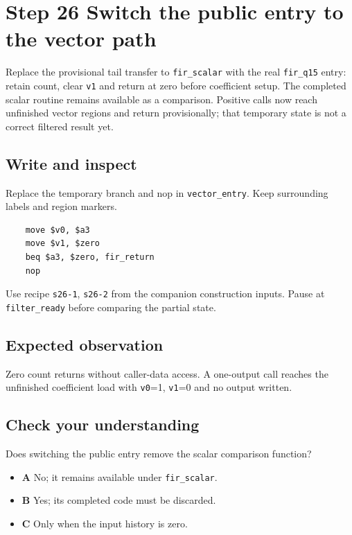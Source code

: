 \section{Step 26 Switch the public entry to the vector path}\label{fir-s26}

Replace the provisional tail transfer to \texttt{fir\_scalar} with the real \texttt{fir\_q15} entry: retain count, clear \texttt{v1} and return at zero before coefficient setup. The completed scalar routine remains available as a comparison. Positive calls now reach unfinished vector regions and return provisionally; that temporary state is not a correct filtered result yet.

\subsection{Write and inspect}
Replace the temporary branch and nop in \texttt{vector\_entry}. Keep surrounding labels and region markers.

\begin{verbatim}
    move $v0, $a3
    move $v1, $zero
    beq $a3, $zero, fir_return
    nop
\end{verbatim}
Use recipe \texttt{s26-1}, \texttt{s26-2} from the companion construction inputs. Pause at \texttt{filter\_ready} before comparing the partial state.

\subsection{Expected observation}
Zero count returns without caller-data access. A one-output call reaches the unfinished coefficient load with \texttt{v0}=1, \texttt{v1}=0 and no output written.

\subsection{Check your understanding}
Does switching the public entry remove the scalar comparison function?

\begin{itemize}
\item \textbf{A} No; it remains available under \texttt{fir\_scalar}.
\item \textbf{B} Yes; its completed code must be discarded.
\item \textbf{C} Only when the input history is zero.
\end{itemize}
